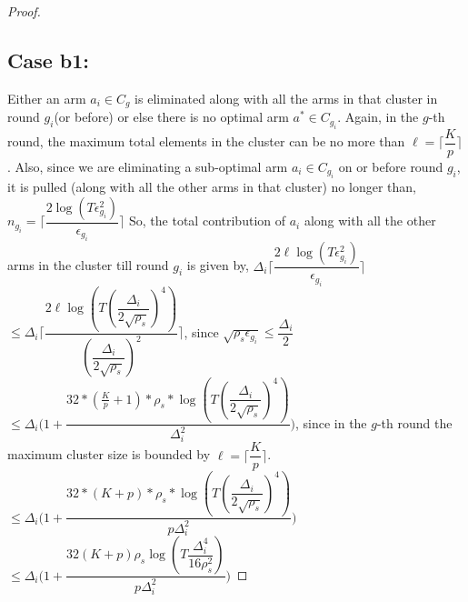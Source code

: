 \begin{proof}
\subsection{Case b1:} 
Either an arm $a_{i}\in C_{g}$ is eliminated along with all the arms in that cluster in round $g_{i}$(or before) or else there is no optimal arm $a^{*}\in C_{g_{i}}$. Again, in the $g$-th round, the maximum total elements in the cluster can be no more than $\ell=\bigg\lceil \dfrac{K}{p}\bigg\rceil$.
\newline
Also, since we are eliminating a sub-optimal arm $a_{i}\in C_{g_{i}}$ on or before round $g_{i}$, it is pulled (along with all the other arms in that cluster) no longer than,
\newline
\hspace*{4em}$n_{g_{i}}=\bigg\lceil\dfrac{2\log{(T\epsilon_{g_{i}}^{2})}}{\epsilon_{g_{i}}}\bigg\rceil$
\newline
So, the total contribution of $a_{i}$  along with all the other arms in the cluster till round $g_{i}$ is given by,
\newline
\hspace*{4em}$\Delta_{i}\bigg\lceil\dfrac{2\ell\log{(T\epsilon_{g_{i}}^{2})}}{\epsilon_{g_{i}}}\bigg\rceil$
$\leq\Delta_{i}\bigg\lceil\dfrac{2\ell\log{(T(\dfrac{\Delta_{i}}{2\sqrt{\rho_{s}}})^{4})}}{(\dfrac{\Delta_{i}}{2\sqrt{\rho_{s}}})^{2}}\bigg\rceil$, since $\sqrt{\rho_{s}\epsilon_{g_{i}}}\leq\dfrac{\Delta_{i}}{2}$
\newline
\hspace*{12em}
$\leq\Delta_{i}\bigg(1+\dfrac{32*(\frac{K}{p}+1)*\rho_{s}*\log{(T(\dfrac{\Delta_{i}}{2\sqrt{\rho_{s}}})^{4})}}{\Delta_{i}^{2}}\bigg)$, since in the $g$-th round the maximum cluster size is bounded by $\ell=\bigg\lceil \dfrac{K}{p} \bigg\rceil$.
\newline
\hspace*{12em}$\leq\Delta_{i}\bigg(1+\dfrac{32*(K+p)*\rho_{s}*\log{(T(\dfrac{\Delta_{i}}{2\sqrt{\rho_{s}}})^{4})}}{p\Delta_{i}^{2}}\bigg)$
\newline
\hspace*{12em}
$\leq\Delta_{i}\bigg(1+\dfrac{32(K+p)\rho_{s}\log{(T\dfrac{\Delta_{i}^{4}}{16\rho_{s}^{2}})}}{p\Delta_{i}^{2}}\bigg)$

\end{proof}
